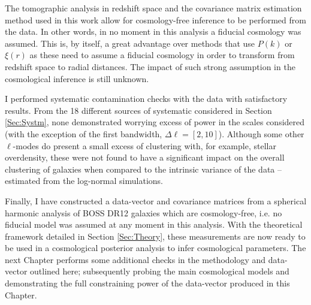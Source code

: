\qquad The tomographic analysis in redshift space and the covariance matrix estimation method used in this work allow for cosmology-free inference to be performed from the data. In other words, in no moment in this analysis a fiducial cosmology was assumed. This is, by itself, a great advantage over methods that use $P(k)$ or $\xi(r)$ as these need to assume a fiducial cosmology in order to transform from redshift space to radial distances. The impact of such strong assumption in the cosmological inference is still unknown.

\qquad I performed systematic contamination checks with the data with satisfactory results. From the 18 different sources of systematic considered in Section \ref{Sec:Systm}, none demonstrated worrying excess of power in the scales considered (with the exception of the first bandwidth, $\Delta \ell = [2,10]$). Although some other $\ell$-modes do present a small excess of clustering with, for example, stellar overdensity, these were not found to have a significant impact on the overall clustering of galaxies when compared to the intrinsic variance of the data -- estimated from the log-normal simulations.

\qquad Finally, I have constructed a data-vector and covariance matrices from a spherical harmonic analysis of BOSS DR12 galaxies which are cosmology-free, i.e. no fiducial model was assumed at any moment in this analysis. With the theoretical framework detailed in Section \ref{Sec:Theory}, these measurements are now ready to be used in a cosmological posterior analysis to infer cosmological parameters. The next Chapter performs some additional checks in the methodology and data-vector outlined here; subsequently probing the main cosmological models and demonstrating the full constraining power of the data-vector produced in this Chapter.